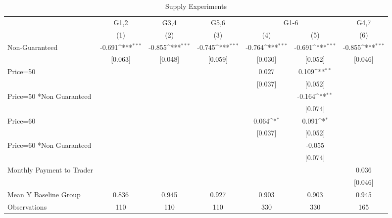 {
\def\sym#1{\ifmmode^{#1}\else\(^{#1}\)\fi}
\begin{longtable}{l*{6}{c}}
\caption{Supply Experiments \label{tab:lif}}\\
\hline\hline\endfirsthead\hline\endhead\hline\endfoot\endlastfoot
                &\multicolumn{1}{c}{G1,2}&\multicolumn{1}{c}{G3,4}&\multicolumn{1}{c}{G5,6}&\multicolumn{2}{c}{G1-6}             &\multicolumn{1}{c}{G4,7}\\\cmidrule(lr){2-2}\cmidrule(lr){3-3}\cmidrule(lr){4-4}\cmidrule(lr){5-6}\cmidrule(lr){7-7}
                &\multicolumn{1}{c}{(1)}         &\multicolumn{1}{c}{(2)}         &\multicolumn{1}{c}{(3)}         &\multicolumn{1}{c}{(4)}         &\multicolumn{1}{c}{(5)}         &\multicolumn{1}{c}{(6)}         \\
\hline
Non-Guaranteed  &   -0.691\sym{***}&   -0.855\sym{***}&   -0.745\sym{***}&   -0.764\sym{***}&   -0.691\sym{***}&   -0.855\sym{***}\\
                &  [0.063]         &  [0.048]         &  [0.059]         &  [0.030]         &  [0.052]         &  [0.046]         \\
Price=50        &                  &                  &                  &    0.027         &    0.109\sym{**} &                  \\
                &                  &                  &                  &  [0.037]         &  [0.052]         &                  \\
Price=50 *Non Guaranteed&                  &                  &                  &                  &   -0.164\sym{**} &                  \\
                &                  &                  &                  &                  &  [0.074]         &                  \\
Price=60        &                  &                  &                  &    0.064\sym{*}  &    0.091\sym{*}  &                  \\
                &                  &                  &                  &  [0.037]         &  [0.052]         &                  \\
Price=60 *Non Guaranteed&                  &                  &                  &                  &   -0.055         &                  \\
                &                  &                  &                  &                  &  [0.074]         &                  \\
Monthly Payment to Trader&                  &                  &                  &                  &                  &    0.036         \\
                &                  &                  &                  &                  &                  &  [0.046]         \\
\hline
Mean Y Baseline Group&    0.836         &    0.945         &    0.927         &    0.903         &    0.903         &    0.945         \\
Observations    &      110         &      110         &      110         &      330         &      330         &      165         \\
\hline\hline
\end{longtable}
}
